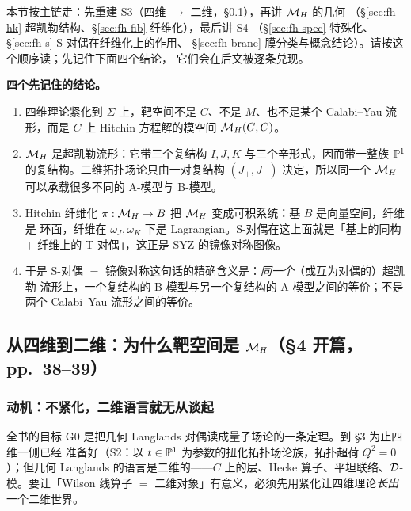本节按主链走：先重建 S3（四维 $\to$ 二维，\S\ref{sec:fh-from4d}），再讲 $\mathcal{M}_H$ 的几何
（\S\ref{sec:fh-hk} 超凯勒结构、\S\ref{sec:fh-fib} 纤维化），最后讲 S4
（\S\ref{sec:fh-spec} 特殊化、\S\ref{sec:fh-s} S-对偶在纤维化上的作用、
\S\ref{sec:fh-brane} 膜分类与概念结论）。请按这个顺序读；先记住下面四个结论，
它们会在后文被逐条兑现。

\begin{keyidea}
\textbf{四个先记住的结论。}
\begin{enumerate}
\item 四维理论紧化到 $\Sigma$ 上，靶空间不是 $C$、不是 $M$、也不是某个 Calabi--Yau
流形，而是 $C$ 上 Hitchin 方程解的模空间 $\mathcal{M}_H(G,C)$。\pA{}
\item $\mathcal{M}_H$ 是超凯勒流形：它带三个复结构 $I,J,K$ 与三个辛形式，因而带一整族
$\mathbb{P}^1$ 的复结构。二维拓扑场论只由一对复结构 $(J_+,J_-)$ 决定，所以同一个 $\mathcal{M}_H$
可以承载很多不同的 A-模型与 B-模型。\pA{}
\item Hitchin 纤维化 $\pi:\mathcal{M}_H\to B$ 把 $\mathcal{M}_H$ 变成可积系统：基 $B$ 是向量空间，纤维是
环面，纤维在 $\omega_J,\omega_K$ 下是 Lagrangian。S-对偶在这上面就是「基上的同构
$+$ 纤维上的 T-对偶」，这正是 SYZ 的镜像对称图像。\pA{}
\item 于是 S-对偶 $=$ 镜像对称这句话的精确含义是：\emph{同一个}（或互为对偶的）超凯勒
流形上，一个复结构的 B-模型与另一个复结构的 A-模型之间的等价；不是两个 Calabi--Yau
流形之间的等价。\pA{}\pA{}
\end{enumerate}
\end{keyidea}

\subsection{从四维到二维：为什么靶空间是 $\mathcal{M}_H$（§4 开篇，pp.~38--39）}
\label{sec:fh-from4d}

\subsubsection*{动机：不紧化，二维语言就无从谈起}

全书的目标 G0 是把几何 Langlands 对偶读成量子场论的一条定理。到 §3 为止四维一侧已经
准备好（S2：以 $t\in\mathbb{P}^1$ 为参数的扭化拓扑场论族，拓扑超荷 $Q^2=0$）；但几何 Langlands
的语言是二维的——$C$ 上的层、Hecke 算子、平坦联络、$\mathcal{D}$-模。要让「Wilson 线算子
$=$ 二维对象」有意义，必须先用紧化让四维理论\emph{长出}一个二维世界。

